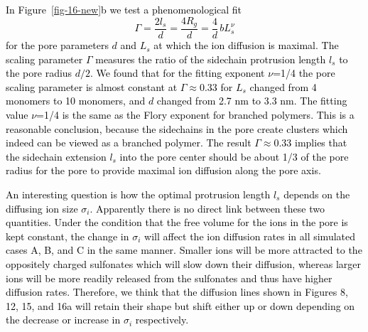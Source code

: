 \documentclass[3p,english,preprint]{elsarticle}
\newcommand{\need}[1]{\textcolor{black}{#1}}
\newcommand{\mage}[1]{\textcolor{black}{#1}}
\begin{document}
{\need{
 In Figure~\ref{fig-16-new}b we test a phenomenological fit 
\begin{equation}
\Gamma = \frac{2 l_s}{d} =  \frac{4 R_g}{d}  
       = \frac{4}{d} \, {b  L_s^{\nu}}
\label{gamma}
\end{equation} 
for the pore parameters $d$ and  $L_s$  at which the ion diffusion is maximal.
The scaling parameter $\Gamma$ measures the ratio of the sidechain protrusion length $l_s$  
to the pore radius $d/2$. We found that
for the fitting exponent $\nu$=1/4 the pore scaling parameter is almost 
constant at $\Gamma$$\approx$0.33 for $L_s$ changed from 4 monomers  to 10 monomers, 
and $d$ changed from 2.7 nm to 3.3 nm. 
The fitting value $\nu$=1/4 is the same as the Flory exponent for branched polymers. This 
is a reasonable conclusion, because the sidechains in the pore 
create clusters which indeed can be viewed as 
a branched polymer. 
The result $\Gamma$$\approx$0.33 implies that the sidechain extension
$l_s$ into the pore center should be about 1/3 of the pore radius for 
the pore to provide  maximal ion diffusion along the pore axis. 
}}

{\need{ 
An interesting question is how the optimal protrusion length $l_s$ depends on the 
diffusing ion size $\sigma_i$. Apparently there is no direct link between
these two quantities. Under the condition that the free volume for the ions in the pore is kept constant, 
the change in $\sigma_i$ will affect the ion diffusion rates in 
all simulated cases A, B, and C in the same manner. Smaller ions will be more attracted to the 
oppositely charged sulfonates which will slow down their diffusion, whereas larger ions will be more 
readily released from the sulfonates and thus have higher diffusion rates. Therefore, we think that 
the diffusion lines  shown in Figures 8, 12, 15, and 
16a will retain their shape but shift either up or down depending on 
the decrease or increase in  $\sigma_i$ respectively.    
}}     
\end{document}
